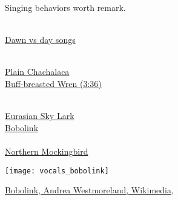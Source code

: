 \documentclass[t]{beamer}
\begin{document}

\begin{frame}{Singing behaviors worth remark.}

\begin{multicols}{2}
\hangpara \href{https://www.youtube.com/watch?v=r6_LYIdYxz4}{}\\[1ex]
\hspace{1em}\href{https://academy.allaboutbirds.org/peterson-field-guide-to-bird-sounds/?speciesCode=sumtan\&species=Summer\%20Tanager\%20-\%20Piranga\%20rubra}{Dawn vs day songs}

\hangpara {}\\[1ex]
\hspace{1em}\href{https://academy.allaboutbirds.org/peterson-field-guide-to-bird-sounds/?speciesCode=placha\&species=Plain\%20Chachalaca\%20-\%20Ortalis\%20vetula}{Plain Chachalaca}\\
\hspace{1em}\href{https://macaulaylibrary.org/asset/28907}{Buff-breasted Wren (3:36)}

\hangpara \href{}{}\\[1ex]
\hspace{1em}\href{https://youtu.be/9pcvhDKDKv4}{Eurasian Sky Lark}\\
\hspace{1em}\href{https://macaulaylibrary.org/asset/239370861}{Bobolink}\\

\hangpara {}\\[1ex]
\hspace{1em} \href{https://macaulaylibrary.org/asset/243816281}{Northern Mockingbird}

\columnbreak

\centering
\noindent \texttt{[image: vocals\_bobolink]}

\end{multicols}

\vfilll

\tinyfill \href{https://commons.wikimedia.org/w/index.php?curid=26015716}{Bobolink, Andrea Westmoreland, Wikimedia, }


\end{frame}
\end{document}
